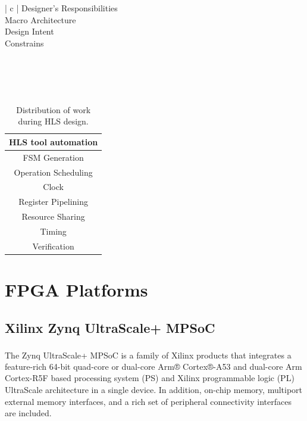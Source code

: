 \begin{table}[H]
    \center
    \begin{tabular}{ | c | }
        \hline
        Designer's Responsibilities\\
        \hline
        Macro Architecture\\
        Design Intent\\
        Constrains\\
        \hline
         \\
         \\
         \\
         \\
    \end{tabular}
    \quad
    \begin{tabular}{ | c | }
        \hline
        HLS tool automation\\
        \hline
        FSM Generation\\
        Operation Scheduling\\
        Clock\\
        Register Pipelining\\
        Resource Sharing\\
        Timing\\
        Verification\\
        \hline
    \end{tabular}
    \caption[HLS responsibilities]{Distribution of work during HLS design.}
    \label{HLS responsibilities}
\end{table}

\section{FPGA Platforms}

\subsection{Xilinx Zynq UltraScale+ MPSoC}
The Zynq\textsuperscript{\textregistered} UltraScale+\texttrademark{} MPSoC is a family of Xilinx products that integrates a feature-rich 64-bit quad-core or dual-core Arm® Cortex®-A53 and dual-core Arm Cortex-R5F based processing system (PS) and Xilinx programmable logic (PL) UltraScale architecture in a single device. In addition, on-chip memory, multiport external memory interfaces, and a rich set of peripheral connectivity interfaces are included. \cite{Zynq_UltraScale_overview}


